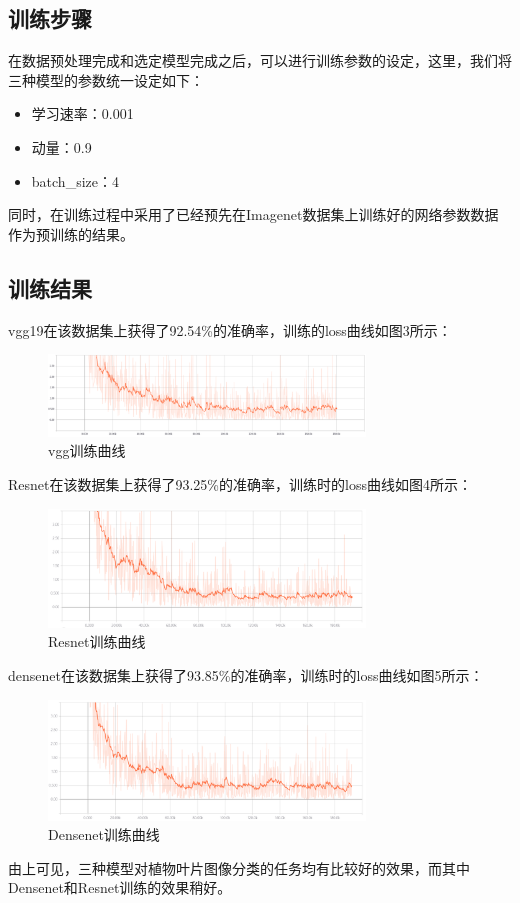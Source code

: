 \documentclass[a4paper]{ctexart} %
\begin{document}
\subsection*{训练步骤}
在数据预处理完成和选定模型完成之后，可以进行训练参数的设定，这里，我们将三种模型的参数统一设定如下：
\begin{itemize}
	\item 学习速率：0.001
	\item 动量：0.9
	\item batch\_size：4
\end{itemize}
同时，在训练过程中采用了已经预先在Imagenet数据集上训练好的网络参数数据作为预训练的结果。

\subsection*{训练结果}
vgg19在该数据集上获得了92.54\%的准确率，训练的loss曲线如图3所示：

\begin{figure}[htbp]
	\centering
	\includegraphics[width=0.75\textwidth]{vgg.png}
	\caption{vgg训练曲线}
	\label{figure}
\end{figure}

Resnet在该数据集上获得了93.25\%的准确率，训练时的loss曲线如图4所示：

\begin{figure}[htbp]
	\centering
	\includegraphics[width=0.75\textwidth]{resnet.png}
	\caption{Resnet训练曲线}
	\label{figure}
\end{figure}

densenet在该数据集上获得了93.85\%的准确率，训练时的loss曲线如图5所示：

\begin{figure}[htbp]
	\centering
	\includegraphics[width=0.75\textwidth]{densenet.png}
	\caption{Densenet训练曲线}
	\label{figure}
\end{figure}
由上可见，三种模型对植物叶片图像分类的任务均有比较好的效果，而其中Densenet和Resnet训练的效果稍好。
\end{document}
